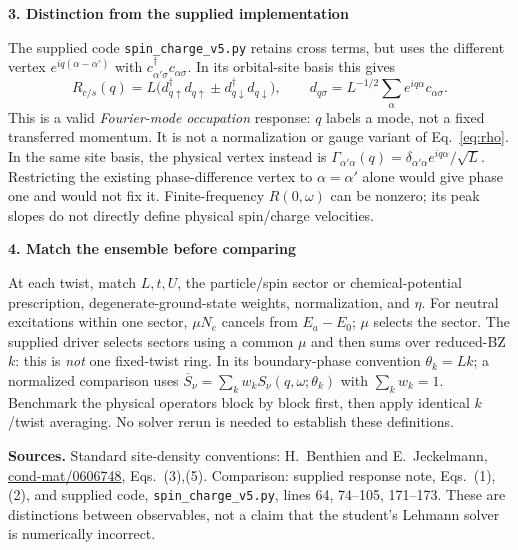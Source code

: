 \documentclass[10pt,letterpaper]{article}
\newcommand{\lead}[1]{\par\smallskip\textbf{#1}\par\nobreak}
\begin{document}
\lead{3. Distinction from the supplied implementation}
The supplied code \texttt{spin\_charge\_v5.py} retains cross terms, but uses the
different vertex $e^{iq(\alpha-\alpha')}$ with
$c^\dagger_{\alpha'\sigma}c_{\alpha\sigma}$. In its orbital-site basis this gives
\begin{equation}
 R_{c/s}(q)=L\bigl(d^\dagger_{q\uparrow}d_{q\uparrow}
             \pm d^\dagger_{q\downarrow}d_{q\downarrow}\bigr),\qquad
 d_{q\sigma}=L^{-1/2}\sum_\alpha e^{iq\alpha}c_{\alpha\sigma}.
\end{equation}
This is a valid \emph{Fourier-mode occupation} response: $q$ labels a mode,
not a fixed transferred momentum. It is not a normalization or gauge variant
of Eq.~\eqref{eq:rho}. In the same site basis, the physical vertex instead is
$\Gamma_{\alpha'\alpha}(q)=\delta_{\alpha'\alpha}e^{iq\alpha}/\sqrt L$.
Restricting the existing phase-difference vertex to $\alpha=\alpha'$ alone would
give phase one and would not fix it. Finite-frequency $R(0,\omega)$ can be
nonzero; its peak slopes do not directly define physical spin/charge velocities.

\lead{4. Match the ensemble before comparing}
At each twist, match $L,t,U$, the particle/spin sector or chemical-potential
prescription, degenerate-ground-state weights, normalization, and $\eta$.
For neutral excitations within one sector, $\mu N_e$ cancels from $E_a-E_0$;
$\mu$ selects the sector. The supplied driver selects sectors using a common
$\mu$ and then sums over reduced-BZ $k$: this is \emph{not} one fixed-twist ring.
In its boundary-phase convention $\theta_k=Lk$; a normalized comparison uses
$\overline S_\nu=\sum_k w_k S_\nu(q,\omega;\theta_k)$ with $\sum_k w_k=1$.
Benchmark the physical operators block by block first, then apply identical
$k$/twist averaging. No solver rerun is needed to establish these definitions.

\vfill
{\footnotesize\textbf{Sources.} Standard site-density conventions:
H.~Benthien and E.~Jeckelmann,
\href{https://arxiv.org/abs/cond-mat/0606748}{cond-mat/0606748}, Eqs.~(3),(5).
Comparison: supplied response note, Eqs.~(1),(2), and supplied code,
\texttt{spin\_charge\_v5.py}, lines 64, 74--105, 171--173.
These are distinctions between observables, not a claim that the student's
Lehmann solver is numerically incorrect.}
\end{document}
